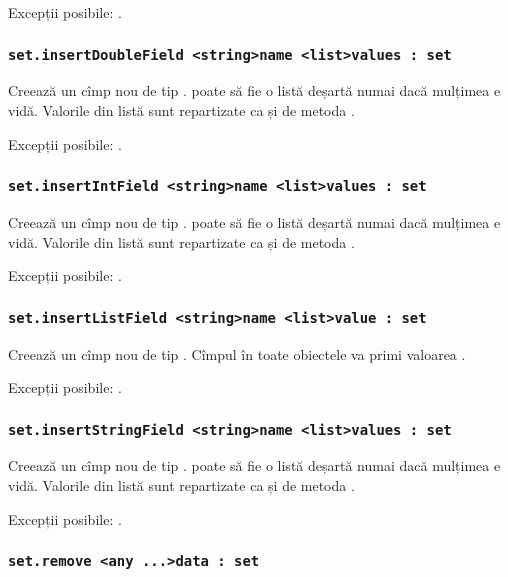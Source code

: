 Excepții posibile: .

\subsubsection{\lstinline|set.insertDoubleField <string>name <list>values : set|}

Creează un cîmp nou de tip \double.  poate să fie o listă deșartă numai dacă mulțimea e vidă. Valorile din listă sunt repartizate ca și de metoda .

Excepții posibile: .

\subsubsection{\lstinline|set.insertIntField <string>name <list>values : set|}

Creează un cîmp nou de tip \integer.  poate să fie o listă deșartă numai dacă mulțimea e vidă. Valorile din listă sunt repartizate ca și de metoda .

Excepții posibile: .

\subsubsection{\lstinline|set.insertListField <string>name <list>value : set|}

Creează un cîmp nou de tip \bool. Cîmpul  în toate obiectele va primi valoarea .

Excepții posibile: .

\subsubsection{\lstinline|set.insertStringField <string>name <list>values : set|}

Creează un cîmp nou de tip \str.  poate să fie o listă deșartă numai dacă mulțimea e vidă. Valorile din listă sunt repartizate ca și de metoda .

Excepții posibile: .

\subsubsection{\lstinline|set.remove <any ...>data : set|}

